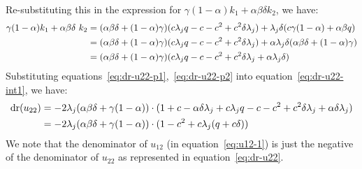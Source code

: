 Re-substituting this in the expression for $\gamma(1-\alpha)k_1+\alpha\beta\delta k_2$, we have:
\begin{align}
\label{eq:dr-u22-p2}
\gamma(1-\alpha)k_1+\alpha\beta\delta\ k_2&=(\alpha\beta\delta+(1-\alpha)\gamma)(c\lambda_j \g -c-c^2+c^2\delta\lambda_j)+\lambda_j\delta(c\gamma(1-\alpha)+\alpha\beta \g )\nonumber\\
&=(\alpha\beta\delta+(1-\alpha)\gamma)(c\lambda_j \g -c-c^2+c^2\delta\lambda_j)+\alpha\lambda_j\delta(\alpha\beta\delta+(1-\alpha)\gamma)\nonumber\\
&=(\alpha\beta\delta+(1-\alpha)\gamma)(c\lambda_j \g -c-c^2+c^2\delta\lambda_j+\alpha\lambda_j\delta)
\end{align}
Substituting equations~\ref{eq:dr-u22-p1},~\ref{eq:dr-u22-p2} into equation~\ref{eq:dr-u22-int1}, we have:
\begin{align}
\label{eq:dr-u22}
\text{dr}(u_{22})&=-2\lambda_j(\alpha\beta\delta+\gamma(1-\alpha))\cdot(1+c-\alpha\delta\lambda_j+c\lambda_j q -c-c^2+c^2\delta\lambda_j+\alpha\delta\lambda_j)\nonumber\\
&=-2\lambda_j(\alpha\beta\delta+\gamma(1-\alpha))\cdot(1-c^2+c\lambda_j(q +c\delta))
\end{align}
We note that the denominator of $u_{12}$ (in equation~\ref{eq:u12-1}) is just the negative of the denominator of $u_{22}$ as represented in equation~\ref{eq:dr-u22}.

